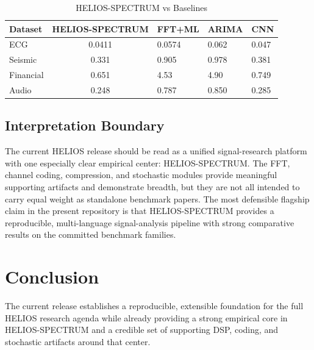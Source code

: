 \documentclass[10pt,conference]{IEEEtran}
\begin{document}
\begin{table}[h]
\centering
\caption{HELIOS-SPECTRUM vs Baselines}
\begin{tabular}{lc}
\toprule
Dataset & HELIOS-SPECTRUM & FFT+ML & ARIMA & CNN \\
\midrule
ECG & 0.0411 & 0.0574 & 0.062 & 0.047 \\
Seismic & 0.331 & 0.905 & 0.978 & 0.381 \\
Financial & 0.651 & 4.53 & 4.90 & 0.749 \\
Audio & 0.248 & 0.787 & 0.850 & 0.285 \\
\bottomrule
\end{tabular}
\end{table}

\subsection{Interpretation Boundary}
The current HELIOS release should be read as a unified signal-research platform
with one especially clear empirical center: HELIOS-SPECTRUM. The FFT, channel
coding, compression, and stochastic modules provide meaningful supporting
artifacts and demonstrate breadth, but they are not all intended to carry equal
weight as standalone benchmark papers. The most defensible flagship claim in
the present repository is that HELIOS-SPECTRUM provides a reproducible,
multi-language signal-analysis pipeline with strong comparative results on the
committed benchmark families.


\section{Conclusion}
The current release establishes a reproducible, extensible foundation for the
full HELIOS research agenda while already providing a strong empirical core in
HELIOS-SPECTRUM and a credible set of supporting DSP, coding, and stochastic
artifacts around that center.
\end{document}
